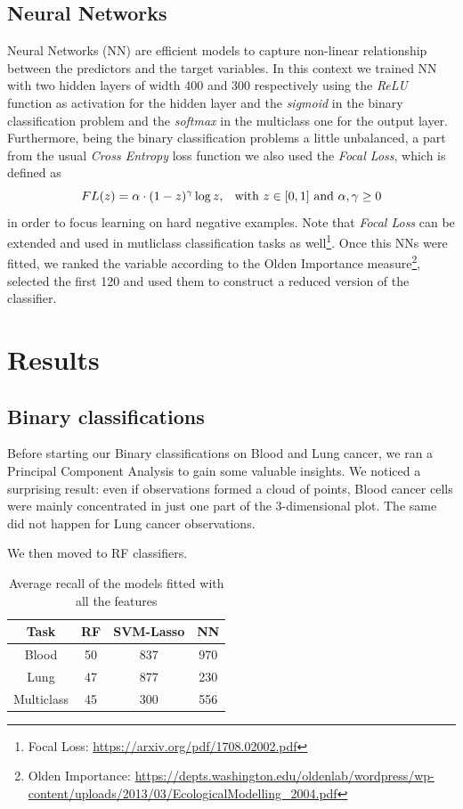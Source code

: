 \documentclass[a4paper,11pt, oneside]{article}  %
\begin{document}
\subsection{Neural Networks}
Neural Networks (NN) are efficient models to capture non-linear relationship between the predictors and the target variables.  In this context we trained NN with two hidden layers of width 400 and 300 respectively using  the \textit{ReLU} function as activation  for the hidden layer and the \textit{sigmoid} in the binary classification problem and the \textit{softmax} in the multiclass one for the output layer.  Furthermore,  being the binary classification problems a little unbalanced,  a part from the usual \textit{Cross Entropy} loss function we also used the \textit{Focal Loss}, which is defined as $$ FL(z) = \alpha \cdot (1 - z)^{\gamma} \log{z} \text{,  \hspace{3pt} with }z \in [0,1]  \text{ and } \alpha,  \gamma \geq 0$$ in order to focus learning on hard negative examples.  Note that \textit{Focal Loss} can be extended and used in mutliclass classification tasks as well\footnote{Focal Loss: \url{https://arxiv.org/pdf/1708.02002.pdf}}.  Once this NNs were fitted,  we ranked the variable according to the Olden Importance measure\footnote{Olden Importance: \url{https://depts.washington.edu/oldenlab/wordpress/wp-content/uploads/2013/03/EcologicalModelling_2004.pdf}}, selected the first 120 and used them to construct a reduced version of the classifier.



\section{Results}
\subsection{Binary classifications}
Before starting our Binary classifications on Blood and Lung cancer, we ran a Principal Component Analysis to gain some valuable insights. We noticed a surprising result: even if observations formed a cloud of points, Blood cancer cells were mainly concentrated in just one part of the 3-dimensional plot. The same did not happen for Lung cancer observations.

We then moved to RF classifiers. 

\begin{table}[ht]
\caption{Average recall of the models fitted with all the features}
\centering
\begin{tabular}{c c c c}
\hline\hline
Task & RF & SVM-Lasso & NN \\ [0.5ex] %
\hline
Blood & 50 & 837 & 970 \\
Lung &47 & 877 & 230 \\
Multiclass & 45 & 300 & 556 \\ [1ex]
\hline
\end{tabular}
\label{table:big_models}
\end{table}
\end{document}
